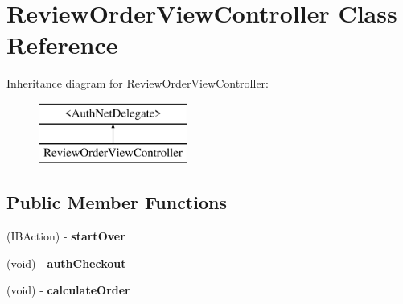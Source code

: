 \hypertarget{interface_review_order_view_controller}{
\section{ReviewOrderViewController Class Reference}
\label{interface_review_order_view_controller}
}
Inheritance diagram for ReviewOrderViewController:\begin{figure}[H]
\begin{center}
\leavevmode
\includegraphics[height=2.000000cm]{interface_review_order_view_controller}
\end{center}
\end{figure}
\subsection*{Public Member Functions}
\begin{DoxyCompactItemize}
\item 
\hypertarget{interface_review_order_view_controller_a625c526fb030fe1a9fca019fb727c2f4}{
(IBAction) -\/ {\bfseries startOver}}
\label{interface_review_order_view_controller_a625c526fb030fe1a9fca019fb727c2f4}

\item 
\hypertarget{interface_review_order_view_controller_a913c499f488fb745670dd8941d7f5959}{
(void) -\/ {\bfseries authCheckout}}
\label{interface_review_order_view_controller_a913c499f488fb745670dd8941d7f5959}

\item 
\hypertarget{interface_review_order_view_controller_a84c56712ec8de7695c64061773273492}{
(void) -\/ {\bfseries calculateOrder}}
\label{interface_review_order_view_controller_a84c56712ec8de7695c64061773273492}

\end{DoxyCompactItemize}
